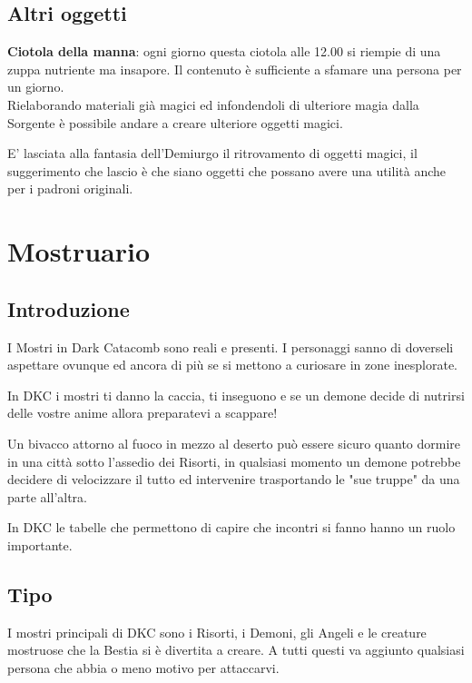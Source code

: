 \documentclass[a4paper,twoside,openany]{book}
\begin{document}
\begin{multicols}{2}
\subsection{Altri oggetti}

\textbf{Ciotola della manna}: ogni giorno questa ciotola alle 12.00 si riempie di una zuppa nutriente ma insapore. Il contenuto è sufficiente a sfamare una persona per un giorno.\\

Rielaborando materiali già magici ed infondendoli di ulteriore magia dalla Sorgente è possibile andare a creare ulteriore oggetti magici.

E' lasciata alla fantasia dell'Demiurgo il ritrovamento di oggetti magici, il suggerimento che lascio è che siano oggetti che possano avere una utilità anche per i padroni originali.


\end{multicols}

\pagebreak

\section{Mostruario}

\subsection{Introduzione}

I Mostri in Dark Catacomb sono reali e presenti.
I personaggi sanno di doverseli aspettare ovunque ed ancora di più se si mettono a curiosare in zone inesplorate.

In DKC i mostri ti danno la caccia, ti inseguono e se un demone decide di nutrirsi delle vostre anime allora preparatevi a scappare!

Un bivacco attorno al fuoco in mezzo al deserto può essere sicuro quanto dormire in una città sotto l'assedio dei Risorti, in qualsiasi momento un demone potrebbe decidere di velocizzare il tutto ed intervenire trasportando le "sue truppe" da una parte all'altra.

In DKC le tabelle che permettono di capire che incontri si fanno hanno un ruolo importante.


\subsection{Tipo}

I mostri principali di DKC sono i Risorti, i Demoni, gli Angeli e le creature mostruose che la Bestia si è divertita a creare. A tutti questi va aggiunto qualsiasi persona che abbia o meno motivo per attaccarvi.
\end{document}
